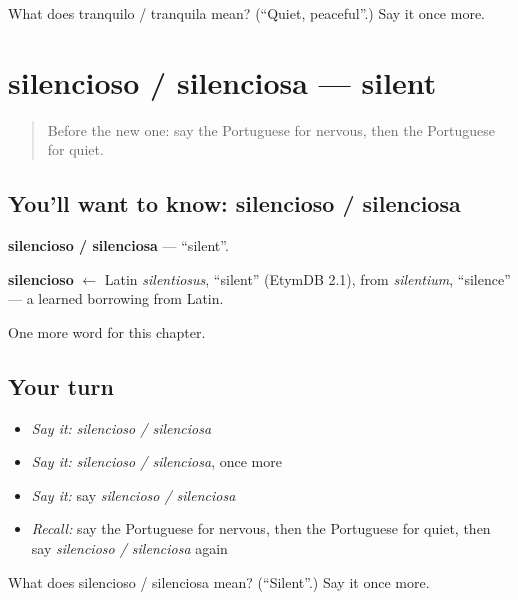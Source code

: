 \begin{tcolorbox}[breakable,colback=teal!4,colframe=teal!35!black,title={Before you move on}]
What does tranquilo / tranquila mean? (\textquotedblleft{}Quiet, peaceful\textquotedblright{}.) Say it once more.
\end{tcolorbox}
\section[silencioso / silenciosa]{silencioso / silenciosa — silent}

\label{lesson:PT-C215-silencioso-silenciosa}



\begin{quote}
Before the new one: say the Portuguese for nervous, then the Portuguese for quiet.
\end{quote}

\subsection*{You'll want to know: silencioso / silenciosa}
\textbf{silencioso / silenciosa} — \textquotedblleft{}silent\textquotedblright{}.

\begin{cousinweb}
\textbf{silencioso} $\leftarrow$ Latin \emph{silentiosus}, \textquotedblleft{}silent\textquotedblright{} (EtymDB 2.1), from \emph{silentium}, \textquotedblleft{}silence\textquotedblright{} — a learned borrowing from Latin.
\end{cousinweb}

\begin{grammarlens}[title={What you've built}]
One more word for this chapter.
\end{grammarlens}

\subsection*{Your turn}
\begin{itemize}
\raggedright
  \item \emph{Say it:} \emph{silencioso / silenciosa}
  \item \emph{Say it:} \emph{silencioso / silenciosa}, once more
  \item \emph{Say it:} say \emph{silencioso / silenciosa}
  \item \emph{Recall:} say the Portuguese for nervous, then the Portuguese for quiet, then say \emph{silencioso / silenciosa} again
\end{itemize}

\begin{tcolorbox}[breakable,colback=teal!4,colframe=teal!35!black,title={Before you move on}]
What does silencioso / silenciosa mean? (\textquotedblleft{}Silent\textquotedblright{}.) Say it once more.
\end{tcolorbox}
